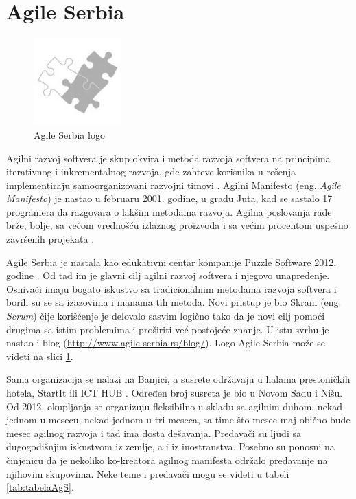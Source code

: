 \documentclass[a4paper]{article}
\begin{document}
{\section{Agile Serbia}
\label{sec:agsrb}

\begin{figure}[H]
  \centering
  \includegraphics[width=0.3\textwidth]{agile_srb.png}
  \caption{Agile Serbia logo}
  \label{fig:agslogo}
\end{figure}

Agilni razvoj softvera je skup okvira i metoda razvoja softvera na principima iterativnog i inkrementalnog razvoja, gde zahteve korisnika u rešenja implementiraju samoorganizovani razvojni timovi \cite{agileForDummies}. Agilni Manifesto (eng. \textit{Agile Manifesto}) je nastao u februaru 2001. godine, u gradu Juta, kad se sastalo 17 programera da razgovara o lakšim metodama razvoja. Agilna poslovanja rade brže, bolje, sa većom vrednošću izlaznog proizvoda i sa većim procentom uspešno završenih projekata \cite{aboutAgileCom}.

Agile Serbia je nastala kao edukativni centar kompanije Puzzle Software 2012. godine \cite{aboutAgS}. Od tad im je glavni cilj agilni razvoj softvera i njegovo unapređenje. Osnivači imaju bogato iskustvo sa tradicionalnim metodama razvoja softvera i borili su se sa izazovima i manama tih metoda. Novi pristup je bio Skram (eng. \textit{Scrum}) čije korišćenje je delovalo sasvim logično tako da je novi cilj pomoći drugima sa istim problemima i proširiti već postojeće znanje. U istu svrhu je nastao i blog (\url{http://www.agile-serbia.rs/blog/}). Logo Agile Serbia može se videti na slici \ref{fig:agslogo}.

Sama organizacija se nalazi na Banjici, a susrete održavaju u halama prestoničkih hotela, StartIt \cite{aboutStarit} ili ICT HUB \cite{aboutICT}. Određen broj susreta je bio u Novom Sadu i Nišu. Od 2012. okupljanja se organizuju fleksibilno u skladu sa agilnim duhom, nekad jednom u mesecu, nekad jednom u tri meseca, sa time što mesec maj obično bude mesec agilnog razvoja i tad ima dosta dešavanja. Predavači su ljudi sa dugogodišnjim iskustvom iz zemlje, a i iz inostranstva. Posebno su ponosni na činjenicu da je nekoliko ko-kreatora agilnog manifesta održalo predavanje na njihovim skupovima. Neke teme i predavači mogu se videti u tabeli \ref{tab:tabelaAgS}.

}
\end{document}
